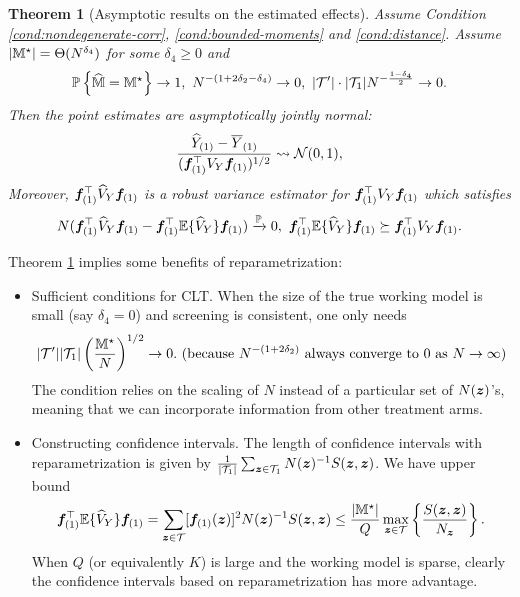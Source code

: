 \documentclass[12pt]{article}
\newtheorem{theorem}{Theorem}
\begin{document}
\begin{theorem}[Asymptotic results on the estimated effects]\label{thm:infer-order} 
Assume Condition \ref{cond:nondegenerate-corr}, \ref{cond:bounded-moments} and \ref{cond:distance}. Assume $|{\mathbb{M}}^\star| = \Theta(N^{\delta_4})$ for some $\delta_4 \ge 0$ and
\begin{align*}
  {{\mathbb{P}}\left\{\widehat{{\mathbb{M}}} = {\mathbb{M}}^\star\right\}} \to 1, ~ {N^{-(1+2\delta_2-\delta_4)}}\to 0, ~|{\mathcal{T}}'|\cdot|{\mathcal{T}}_1|{N}^{-\frac{1-\delta_4}{2}} \to 0.
\end{align*}
Then the point estimates are asymptotically jointly normal:
\begin{align*}
      \frac{ {\widehat{Y}}_{(1)}  -   \overline{Y}_{(1)}}{({\boldsymbol{f}}_{(1)}^\top V_Y {\boldsymbol{f}}_{(1)})^{1/2}} \rightsquigarrow {\mathcal{N}}(0, 1), 
\end{align*}
Moreover,  ${\boldsymbol{f}}_{(1)}^\top \widehat{V}_Y {\boldsymbol{f}}_{(1)}$ is a robust variance estimator for ${\boldsymbol{f}}_{(1)}^\top V_Y {\boldsymbol{f}}_{(1)} $ which satisfies
\begin{align*}
    {N} ({\boldsymbol{f}}_{(1)}^\top \widehat{V}_Y {\boldsymbol{f}}_{(1)} - {\boldsymbol{f}}_{(1)}^\top {\mathbb{E}}\{{\widehat{V}}_Y\}{\boldsymbol{f}}_{(1)})\xrightarrow{{\mathbb{P}}} 0,  ~ {\boldsymbol{f}}_{(1)}^\top {\mathbb{E}}\{{\widehat{V}}_Y\} {\boldsymbol{f}}_{(1)} \succeq {\boldsymbol{f}}_{(1)}^\top V_Y {\boldsymbol{f}}_{(1)}.
\end{align*}

\end{theorem}


Theorem \ref{thm:infer-order} implies some {\color{red} benefits} of reparametrization:
\begin{itemize}
    \item Sufficient conditions for CLT. When the size of the true working model is small (say $\delta_4 = 0$) and screening is consistent, one only needs
\begin{align*}
|{\mathcal{T}}'||{\mathcal{T}}_1|\left(\frac{{\mathbb{M}}^\star}{N}\right)^{1/2} \to 0. \text{ (because ${N^{-(1+2\delta_2)}}$ always converge to $0$ as $N\to\infty$)}
\end{align*}
The condition relies on the scaling of $N$ instead of a particular set of $N({\boldsymbol{z}})$'s, meaning that we can incorporate information from other treatment arms.

\item Constructing confidence intervals. The length of confidence intervals with   reparametrization is given by $\frac{1}{|{\mathcal{T}}_1|}\sum_{{\boldsymbol{z}}\in{\mathcal{T}}_1}N({\boldsymbol{z}})^{-1} {S}({\boldsymbol{z}},{\boldsymbol{z}})$. We have upper bound
\begin{align*}
    {\boldsymbol{f}}_{(1)}^\top {\mathbb{E}}\{\widehat{V}_Y\} {\boldsymbol{f}}_{(1)}  
     = \sum_{{\boldsymbol{z}}\in{\mathcal{T}}} [{\boldsymbol{f}}_{(1)}({\boldsymbol{z}})]^2 N({\boldsymbol{z}})^{-1}S({\boldsymbol{z}},{\boldsymbol{z}})
     \le  \frac{|{\mathbb{M}}^\star|}{Q} \max_{{\boldsymbol{z}}\in{\mathcal{T}}}\left\{\frac{S({\boldsymbol{z}},{\boldsymbol{z}})}{N_{{\boldsymbol{z}}}}\right\}.
\end{align*}
When $Q$ (or equivalently $K$) is large and the working model is sparse, clearly the confidence intervals based on reparametrization has more advantage. 
\end{itemize}
\end{document}
